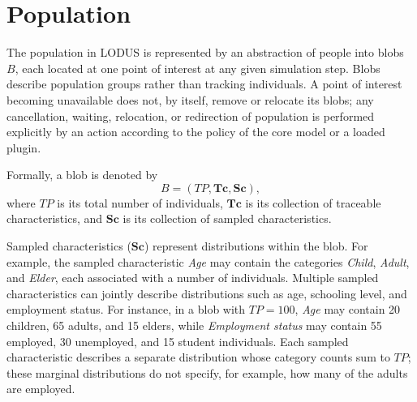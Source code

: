 \section{Population}
\label{sec:population}

The population in LODUS is represented by an abstraction of people into blobs $B$, each located at one point of interest at any given simulation step. Blobs describe population groups rather than tracking individuals. A point of interest becoming unavailable does not, by itself, remove or relocate its blobs; any cancellation, waiting, relocation, or redirection of population is performed explicitly by an action according to the policy of the core model or a loaded plugin. 

Formally, a blob is denoted by
\begin{equation}
B=(TP,\bm{Tc},\bm{Sc}),
\label{eq:blob_definition}
\end{equation}
where $TP$ is its total number of individuals, $\bm{Tc}$ is its collection of traceable characteristics, and $\bm{Sc}$ is its collection of sampled characteristics. 

Sampled characteristics ($\bm{Sc}$) represent distributions within the blob. For example, the sampled characteristic \textit{Age} may contain the categories \textit{Child}, \textit{Adult}, and \textit{Elder}, each associated with a number of individuals. Multiple sampled characteristics can jointly describe distributions such as age, schooling level, and employment status. 
For instance, in a blob with $TP=100$, \textit{Age} may contain 20 children, 65 adults, and 15 elders, while \textit{Employment status} may contain 55 employed, 30 unemployed, and 15 student individuals. Each sampled characteristic describes a separate distribution whose category counts sum to $TP$; these marginal distributions do not specify, for example, how many of
the adults are employed.

